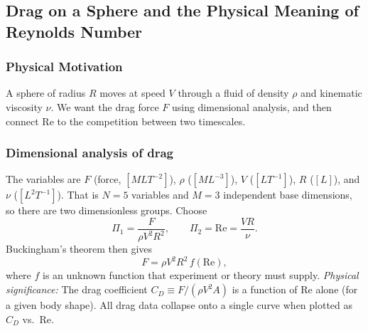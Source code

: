 \subsection{Drag on a Sphere and the Physical Meaning of Reynolds Number}
\label{sec:lec06:reynolds}

\subsubsection*{Physical Motivation}
A sphere of radius $R$ moves at speed $V$ through a fluid of density $\rho$
and kinematic viscosity $\nu$. We want the drag force $F$ using dimensional
analysis, and then connect $\mathrm{Re}$ to the competition between two
timescales.

\subsubsection*{Dimensional analysis of drag}
The variables are $F$ (force, $[MLT^{-2}]$), $\rho$ ($[ML^{-3}]$), $V$
($[LT^{-1}]$), $R$ ($[L]$), and $\nu$ ($[L^2T^{-1}]$). That is $N=5$
variables and $M=3$ independent base dimensions, so there are two
dimensionless groups. Choose
\begin{equation}
    \Pi_1 = \frac{F}{\rho V^2 R^2},
    \qquad
    \Pi_2 = \mathrm{Re} = \frac{V R}{\nu} .
    \label{eq:lec06:drag-pi-groups}
\end{equation}
Buckingham's theorem then gives
\begin{equation}
    \boxed{
    F = \rho V^2 R^2\,f(\mathrm{Re}) ,
    }
    \label{eq:lec06:drag-general}
\end{equation}
where $f$ is an unknown function that experiment or theory must supply.
\textit{Physical significance:} The drag coefficient $C_D \equiv F/(\rho V^2
A)$ is a function of Re alone (for a given body shape). All drag data
collapse onto a single curve when plotted as $C_D$ vs.\ Re.


